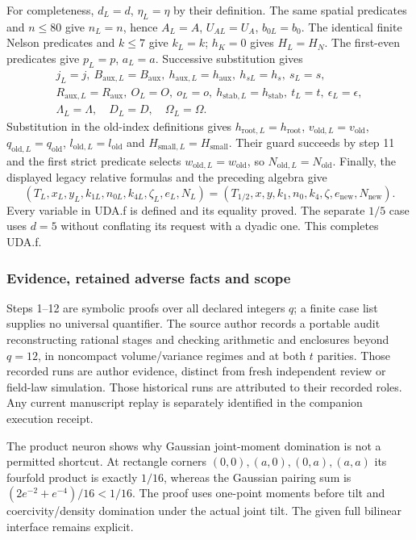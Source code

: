 For completeness, $d_L=d$, $\eta_L=\eta$ by their definition.
The same spatial predicates and $n\le80$ give $n_L=n$, hence $A_L=A$,
$U_{AL}=U_A$, $b_{0L}=b_0$. The identical finite Nelson predicates and
$k\le7$ give $k_L=k$; $h_K=0$ gives $H_L=H_N$. The first-even predicates
give $p_L=p$, $a_L=a$. Successive substitution gives
\begin{gather*}
 j_L=j,\ B_{\mathrm{aux},L}=B_{\mathrm{aux}},\
 h_{\mathrm{aux},L}=h_{\mathrm{aux}},\ h_{sL}=h_s,\ s_L=s,\\
 R_{\mathrm{aux},L}=R_{\mathrm{aux}},\ O_L=O,\ o_L=o,\
 h_{\mathrm{stab},L}=h_{\mathrm{stab}},\ t_L=t,\ \epsilon_L=\epsilon,\\
 \Lambda_L=\Lambda,\quad D_L=D,\quad\Omega_L=\Omega.
\end{gather*}
Substitution in the old-index definitions gives
$h_{\mathrm{root},L}=h_{\mathrm{root}}$,
$v_{\mathrm{old},L}=v_{\mathrm{old}}$,
$q_{\mathrm{old},L}=q_{\mathrm{old}}$,
$l_{\mathrm{old},L}=l_{\mathrm{old}}$ and
$H_{\mathrm{small},L}=H_{\mathrm{small}}$.
Their guard succeeds by step 11 and the first strict predicate selects
$w_{\mathrm{old},L}=w_{\mathrm{old}}$, so $N_{\mathrm{old},L}=N_{\mathrm{old}}$.
Finally, the displayed legacy relative formulas and the preceding algebra give
\[
 (T_L,x_L,y_L,k_{1L},n_{0L},k_{4L},\zeta_L,e_L,N_L)
 =(T_{1/2},x,y,k_1,n_0,k_4,\zeta,e_{\mathrm{new}},N_{\mathrm{new}}).
\]
Every variable in UDA.f is defined and its equality proved. The separate
$1/5$ case uses $d=5$ without conflating its request with a dyadic one.
This completes UDA.f.

\subsubsection{Evidence, retained adverse facts and scope}
Steps 1--12 are symbolic proofs over all declared integers $q$; a finite
case list supplies no universal quantifier. The source author records a
portable audit reconstructing rational stages and checking arithmetic and
enclosures beyond $q=12$, in noncompact volume/variance regimes and at both
$t$ parities. Those recorded runs are author evidence, distinct from fresh
independent review or field-law simulation. Those historical runs are attributed to their recorded roles. Any current
manuscript replay is separately identified in the companion execution receipt.

The product neuron shows why Gaussian joint-moment domination is not a
permitted shortcut. At rectangle corners $(0,0),(a,0),(0,a),(a,a)$ its
fourfold product is exactly $1/16$, whereas the Gaussian pairing sum is
$(2e^{-2}+e^{-4})/16<1/16$. The proof uses one-point moments before
tilt and coercivity/density domination under the actual joint tilt.
The given full bilinear interface remains explicit.

